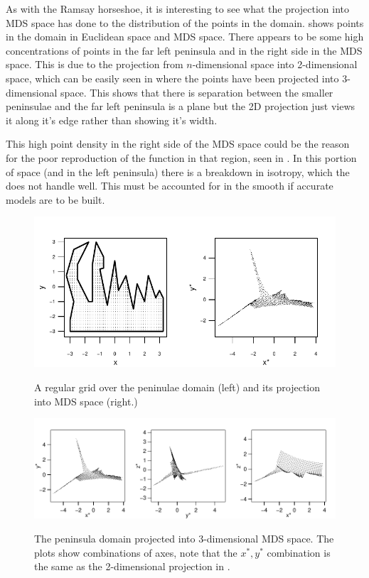 As with the Ramsay horseshoe, it is interesting to see what the projection into MDS space has done to the distribution of the points in the domain.  shows points in the domain in Euclidean space and MDS space. There appears to be some high concentrations of points in the far left peninsula and in the right side in the MDS space. This is due to the projection from $n$-dimensional space into 2-dimensional space, which can be easily seen in  where the points have been projected into 3-dimensional space. This shows that there is separation between the smaller peninsulae and the far left peninsula is a plane but the 2D projection just views it along it's edge rather than showing it's width.

This high point density in the right side of the MDS space could be the reason for the poor reproduction of the function in that region, seen in . In this portion of space (and in the left peninsula) there is a breakdown in isotropy, which the \tprs does not handle well. This must be accounted for in the smooth if accurate models are to be built.

\begin{figure}
\centering
\includegraphics[width=6in]{mds/figs/wt2-2d-proj.pdf} \\
\caption{A regular grid over the peninulae domain (left) and its projection into MDS space (right.)}
\label{wt2-2d-proj}
\end{figure}

\begin{figure}
\centering
\includegraphics[width=9in]{mds/figs/wt2-3d-proj.pdf} \\
\caption{The peninsula domain projected into 3-dimensional MDS space. The plots show combinations of axes, note that the $x^*,y^*$ combination is the same as the 2-dimensional projection in .}
\label{wt2-3d-proj}
\end{figure}

